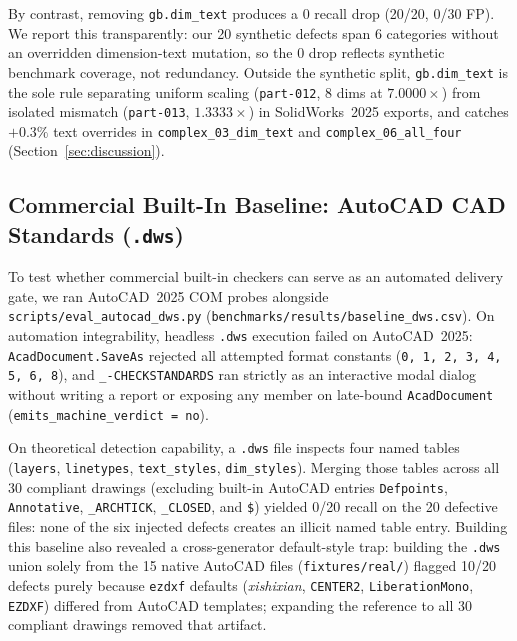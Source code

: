 \documentclass[nocopyright,nolists,upint,varvw,hyphenate]{asmejour}
\begin{document}
By contrast, removing \texttt{gb.dim\_text} produces a 0 recall drop (20/20, 0/30 FP). We report this transparently: our 20 synthetic defects span 6 categories without an overridden dimension-text mutation, so the 0 drop reflects synthetic benchmark coverage, not redundancy. Outside the synthetic split, \texttt{gb.dim\_text} is the sole rule separating uniform scaling (\texttt{part-012}, 8 dims at $7.0000\times$) from isolated mismatch (\texttt{part-013}, $1.3333\times$) in SolidWorks~2025 exports, and catches $+0.3\%$ text overrides in \texttt{complex\_03\_dim\_text} and \texttt{complex\_06\_all\_four} (Section~\ref{sec:discussion}).

\subsection{Commercial Built-In Baseline: AutoCAD CAD Standards (\texttt{.dws})}\label{sec:dws}

To test whether commercial built-in checkers can serve as an automated delivery gate, we ran AutoCAD~2025 COM probes alongside \texttt{scripts/\allowbreak eval\_\allowbreak autocad\_\allowbreak dws.py} (\texttt{benchmarks/\allowbreak results/\allowbreak baseline\_\allowbreak dws.csv}). On automation integrability, headless \texttt{.dws} execution failed on AutoCAD~2025: \texttt{AcadDocument.SaveAs} rejected all attempted format constants (\texttt{0, 1, 2, 3, 4, 5, 6, 8}), and \texttt{\_-\allowbreak CHECKSTANDARDS} ran strictly as an interactive modal dialog without writing a report or exposing any member on late-bound \texttt{AcadDocument} (\texttt{emits\_\allowbreak machine\_\allowbreak verdict = no}).

On theoretical detection capability, a \texttt{.dws} file inspects four named tables (\texttt{layers}, \texttt{linetypes}, \texttt{text\_styles}, \texttt{dim\_styles}). Merging those tables across all 30 compliant drawings (excluding built-in AutoCAD entries \texttt{Defpoints}, \texttt{Annotative}, \texttt{\_ARCHTICK}, \texttt{\_CLOSED}, and \texttt{\$}) yielded 0/20 recall on the 20 defective files: none of the six injected defects creates an illicit named table entry. Building this baseline also revealed a cross-generator default-style trap: building the \texttt{.dws} union solely from the 15 native AutoCAD files (\texttt{fixtures/real/}) flagged 10/20 defects purely because \texttt{ezdxf} defaults (\emph{xishixian}, \texttt{CENTER2}, \texttt{LiberationMono}, \texttt{EZDXF}) differed from AutoCAD templates; expanding the reference to all 30 compliant drawings removed that artifact.
\end{document}
